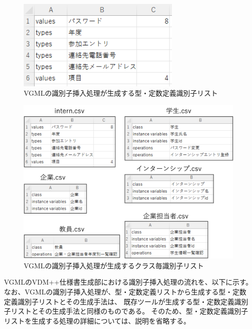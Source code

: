 \begin{figure}[t]
    \begin{center}
        \includegraphics[width=300]{image/vgml_katateisu_id_list.png}
        \caption{VGMLの識別子挿入処理が生成する型・定数定義識別子リスト}
        \label{fig:vgml_katateisu_id_list}
    \end{center}
\end{figure}

\begin{figure}[t]
    \begin{center}
        \includegraphics[width=1.0\columnwidth]{image/vgml_sikibetushi_list.png}
        \caption{VGMLの識別子挿入処理が生成するクラス毎識別子リスト}
        \label{fig:vgml_sikibetushi_list}
    \end{center}
\end{figure}

VGMLのVDM++仕様書生成部における識別子挿入処理の流れを、以下に示す。
なお、VGMLの識別子挿入処理が、型・定数定義リストから生成する型・定数定義識別子リストとその生成手法は、
既存ツールが生成する型・定数定義識別子リストとその生成手法と同様のものである。
そのため、型・定数定義識別子リストを生成する処理の詳細については、説明を省略する。

